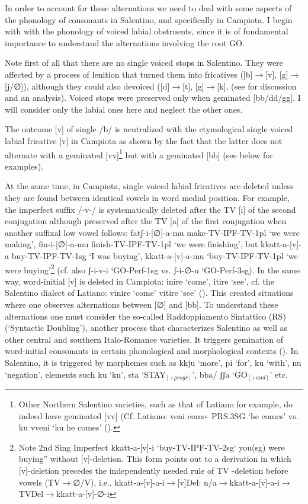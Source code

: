 \documentclass[output=paper]{langscibook}
\begin{document}
In order to account for these alternations we need to deal with some aspects of the phonology of consonants in Salentino, and specifically in Campiota.   I begin with with the phonology of voiced labial obstruents, since it is of fundamental importance to understand the alternations involving the root GO.  

Note first of all that there are no single voiced stops in Salentino.  They were affected by a process of lenition that turned them into fricatives ([b]$\rightarrow$[v], [g]$\rightarrow$ [j/∅]), although they could also devoiced ([d]$\rightarrow$[t], [g]$\rightarrow$[k], (see \cite{calabrese1987a} for discussion and an analysis).  Voiced stops were preserved only when geminated [bb/dd/gg]. I will consider only the labial ones here and neglect the other ones.

The outcome [v] of single /b/ is neutralized with the etymological single voiced labial fricative [v] in Campiota as shown by the fact that  the latter does not alternate with a geminated [vv]\footnote{Other Northern Salentino varieties, such as that of Latiano for example, do indeed have geminated [vv] (Cf. Latiano: veni come- PRS.3SG ‘he comes’ vs. ku vveni ‘ku he comes’ (\cite{urgese2003a}).}  but with a geminated [bb] (see below for examples).

At the same time, in Campiota, single voiced labial fricatives are deleted unless they are found between identical vowels in word medial position.  For example, the imperfect suffix /-v-/ is systematically deleted after the TV [i] of the second conjugation although preserved after the TV [a] of the first conjugation when  another suffixal low vowel follows: fatʃ-i-[∅]-a-mu make-TV-IPF-TV-1pl ‘we were making’, fin-i-[∅]-a-mu finish-TV-IPF-TV-1pl ‘we were finishing’, but kkatt-a-[v]-a  buy-TV-IPF-TV-1sg ‘I was buying’, kkatt-a-[v]-a-mu ‘buy-TV-IPF-TV-1pl ‘we were buying’\footnote{Note 2nd Sing Imperfect kkatt-a-[v]-i ‘buy-TV-IPF-TV-2sg‘ you(sg) were buying” without [v]-deletion.  This form points out to a derivation in which [v]-deletion precedes the independently needed rule of TV -deletion before vowels (TV$\rightarrow$∅/V), i.e., kkatt-a-[v]-a-i$\rightarrow$[v]Del: n/a$\rightarrow$kkatt-a-[v]-a-i$\rightarrow$TVDel$\rightarrow$kkatt-a-[v]-∅-i}  (cf. also ʃ-i-v-i ‘GO-Perf-1sg vs. ʃ-i-∅-u ‘GO-Perf-3sg).  In the same way, word-initial [v] is deleted in Campiota: inire  ‘come’, itire ‘see’, cf. the Salentino dialect of Latiano: vinire ‘come’ vitire ‘see’ (\cite{urgese2003a}).   This created situations where one observes alternations between [∅] and [bb]. To understand these alternations one must consider the so-called Raddoppiamento Sintattico (RS) (‘Syntactic Doubling’), another process that characterizes Salentino as well as other central and southern Italo-Romance varieties.  It triggers gemination of word-initial consonants in certain phonological and morphological contexts (\cite{chierchia1986a, loporcaro1997}).  In Salentino, it is triggered by morphemes such as kkju ‘more’, pi ‘for’, ku ‘with’, nu ‘negation’, elements such ku ‘ku’, sta ‘STAY$_{[+progr]}$’, bba/ ʃʃa ‘GO$_{[+and]}$’ etc.
\end{document}
